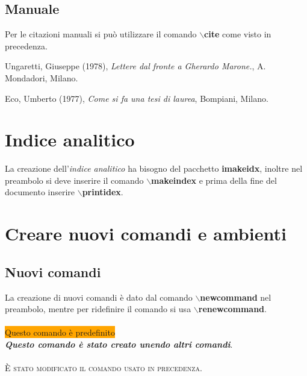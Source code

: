 \documentclass[a4paper,12pt,oneside]{book}
\theoremstyle{plain}
\newcommand{\predefinito}{\colorbox{orange}{Questo comando è predefinito}}
\newcommand{\comando}[1]{\textit{\textbf{#1}}}
\begin{document}
	\printbibliography
	
	\newpage
	\section{Manuale}
	Per le citazioni manuali si può utilizzare il comando \textbf{$\backslash$cite} come visto in precedenza.

	\begin{thebibliography}{9}
		Ungaretti, Giuseppe (1978),
		\emph{Lettere dal fronte a Gherardo Marone.}, A. Mondadori, Milano.
		
		Eco, Umberto (1977),
		\emph{Come si fa una tesi di
			laurea}, Bompiani, Milano.
	\end{thebibliography}


	\chapter{Indice analitico}
	La creazione dell'\emph{indice analitico} ha bisogno del pacchetto \textbf{imakeidx}, inoltre nel preambolo si deve inserire il comando \textbf{$\backslash$makeindex} e prima della fine del documento inserire \textbf{$\backslash$printidex}.
	
	
	\chapter{Creare nuovi comandi e ambienti}
	\section{Nuovi comandi}
	La creazione di nuovi comandi è dato dal comando \textbf{$\backslash$newcommand} nel preambolo, mentre per ridefinire il comando si usa \textbf{$\backslash$renewcommand}.\\
	\\
	\predefinito\\
	\comando{Questo comando è stato creato unendo altri comandi}.\\
	\\
	\renewcommand{\comando}[1]{\textsc{#1}}
	\comando{È stato modificato il comando usato in precedenza}.
	
	
\end{document}
